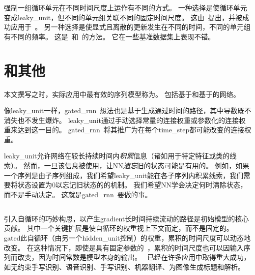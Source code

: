 
强制一组循环单元在不同时间尺度上运作有不同的方式。
一种选择是使循环单元变成\gls{leaky_unit}，但不同的单元组关联不同的固定时间尺度。
这由~\cite{Mozer-nips92}提出，并被成功应用于~\cite{Pascanu+al-ICML2013-small}。
另一种选择是使显式且离散的更新发生在不同的时间，不同的单元组有不同的频率。
这是~\cite{ElHihi+Bengio-nips8}和~\cite{Koutnik-et-al-ICML2014}的方法。
它在一些基准数据集上表现不错。

\section{和其他}
\label{sec:the_long_short_term_memory_and_other_gated_rnns}
本文撰写之时，实际应用中最有效的序列模型称为。
包括基于和基于的网络。

像\gls{leaky_unit}一样，\gls{gated_rnn}~想法也是基于生成通过时间的路径，其中导数既不消失也不发生爆炸。
\gls{leaky_unit}通过手动选择常量的连接权重或参数化的连接权重来达到这一目的。
\gls{gated_rnn}~将其推广为在每个\gls{time_step}都可能改变的连接权重。

\gls{leaky_unit}允许网络在较长持续时间内\emph{积累}信息（诸如用于特定特征或类的线索）。
然而，一旦该信息被使用，让\gls{NN}\emph{遗忘}旧的状态可能是有用的。
例如，如果一个序列是由子序列组成，我们希望\gls{leaky_unit}能在各子序列内积累线索，我们需要将状态设置为0以忘记旧状态的的机制。
我们希望\gls{NN}学会决定何时清除状态，而不是手动决定。
这就是\gls{gated_rnn}~要做的事。

\subsection{}
\label{sec:lstm}
引入自循环的巧妙构思，以产生\gls{gradient}长时间持续流动的路径是初始模型的核心贡献\citep{Hochreiter+Schmidhuber-1997}。
其中一个关键扩展是使自循环的权重视上下文而定，而不是固定的\citep{Gers-et-al-2000}。
\gls{gated}此自循环（由另一个\gls{hidden_unit}控制）的权重，累积的时间尺度可以动态地改变。
在这种情况下，即使是具有固定参数的~，累积的时间尺度也可以因输入序列而改变，因为时间常数是模型本身的输出。
~已经在许多应用中取得重大成功，如无约束手写识别\citep{Graves+Schmidhuber-2009}、语音识别\citep{Graves-et-al-ICASSP2013,Graves+Jaitly-ICML2014}、手写识别\citep{Graves-et-al-ICASSP2013}、机器翻译\citep{Sutskever-et-al-NIPS2014}、为图像生成标题\citep{Kiros-et-al-arxiv2014,Vinyals-et-al-arxiv2014,Xu-et-al-ICML2015}和解析\citep{Vinyals2014}。

